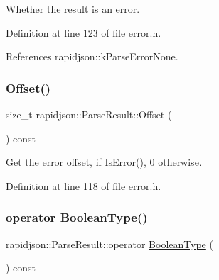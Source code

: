 Whether the result is an error. 



Definition at line 123 of file error.\+h.


\begin{DoxyCode}{0}

\end{DoxyCode}


References rapidjson\+::k\+Parse\+Error\+None.

\mbox{\label{structrapidjson_1_1_parse_result_a85036788b0cfd1c676900de6f8260bd6}} 
\subsubsection{\texorpdfstring{Offset()}{Offset()}}
{\footnotesize\ttfamily size\+\_\+t rapidjson\+::\+Parse\+Result\+::\+Offset (\begin{DoxyParamCaption}{ }\end{DoxyParamCaption}) const}



Get the error offset, if \mbox{\hyperlink{structrapidjson_1_1_parse_result_ab6d87c6ce9c849f35e902fbe23f485c4}{Is\+Error()}}, 0 otherwise. 



Definition at line 118 of file error.\+h.


\begin{DoxyCode}{0}

\end{DoxyCode}
\mbox{\label{structrapidjson_1_1_parse_result_af0936ace1dc9b674e9afb75ec6145b32}} 
\subsubsection{\texorpdfstring{operator BooleanType()}{operator BooleanType()}}
{\footnotesize\ttfamily rapidjson\+::\+Parse\+Result\+::operator \mbox{\hyperlink{structrapidjson_1_1_parse_result_aff2daa285445bba8f76578ea274e34a3}{Boolean\+Type}} (\begin{DoxyParamCaption}{ }\end{DoxyParamCaption}) const}



